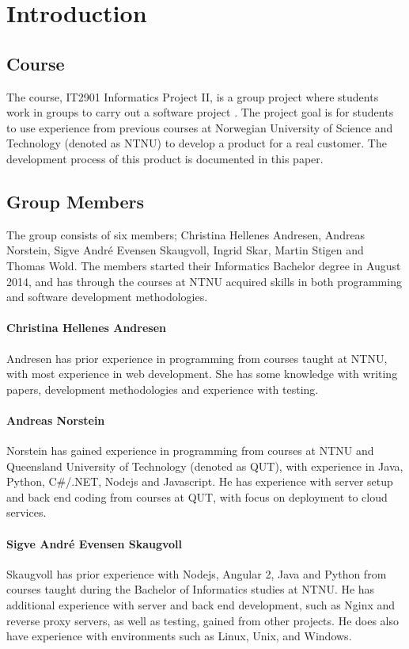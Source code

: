 
\chapter{Introduction}

\section{Course}
The course, IT2901 Informatics Project II, is a group project where students work in groups to carry out a software project \cite{EmneKode}. The project goal is for students to use experience from previous courses at Norwegian University of Science and Technology (denoted as NTNU) to develop a product for a real customer. The development process of this product is documented in this paper.


\section{Group Members}
The group consists of six members; Christina Hellenes Andresen, Andreas Norstein, Sigve André Evensen Skaugvoll, Ingrid Skar, Martin Stigen and Thomas Wold. The members started their Informatics Bachelor degree in August 2014, and has through the courses at NTNU acquired skills in both programming and software development methodologies.

\subsubsection{Christina Hellenes Andresen}
\label{christina}
Andresen has prior experience in programming from courses taught at NTNU, with most experience in web development. She has some knowledge with writing papers, development methodologies and experience with testing.

\subsubsection{Andreas Norstein}
Norstein has gained experience in programming from courses at NTNU and Queensland University of Technology (denoted as QUT), with experience in Java, Python, C\#/.NET, Nodejs and Javascript. He has experience with server setup and back end coding from courses at QUT, with focus on deployment to cloud services. 

\subsubsection{Sigve André Evensen Skaugvoll}
\label{sigve}
Skaugvoll has prior experience with Nodejs, Angular 2, Java and Python from courses taught during the Bachelor of Informatics studies at NTNU. He has additional experience with server and back end development, such as Nginx and reverse proxy servers, as well as testing, gained from other projects. He does also have experience with environments such as Linux, Unix, and Windows.

